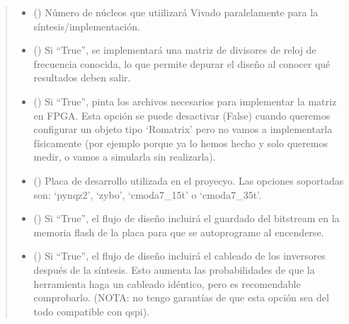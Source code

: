 \documentclass[letterpaper,10pt,english]{sphinxmanual}
\begin{document}
\begin{fulllineitems}
\begin{fulllineitems}
\begin{quote}
\begin{description}
\begin{itemize}
\item {} 
\sphinxAtStartPar
{} (\sphinxstyleliteralemphasis{\sphinxupquote{, }}) \textendash{} Número de núcleos que utiilizará Vivado paralelamente para la síntesis/implementación.

\item {} 
\sphinxAtStartPar
{} (\sphinxstyleliteralemphasis{\sphinxupquote{, }}) \textendash{} Si “True”, se implementará una matriz de divisores de reloj de frecuencia conocida, lo que permite depurar el diseño al conocer qué resultados deben salir.

\item {} 
\sphinxAtStartPar
{} (\sphinxstyleliteralemphasis{\sphinxupquote{, }}) \textendash{} Si “True”, pinta los archivos necesarios para implementar la matriz en FPGA. Esta opción se puede desactivar (False) cuando queremos configurar un objeto tipo ‘Romatrix’ pero no vamos a implementarla físicamente (por ejemplo porque ya lo hemos hecho y solo queremos medir, o vamos a simularla sin realizarla).

\item {} 
\sphinxAtStartPar
{} (\sphinxstyleliteralemphasis{\sphinxupquote{, }}) \textendash{} Placa de desarrollo utilizada en el proyecyo. Las opciones soportadas son: ‘pynqz2’, ‘zybo’, ‘cmoda7\_15t’ o ‘cmoda7\_35t’.

\item {} 
\sphinxAtStartPar
{} (\sphinxstyleliteralemphasis{\sphinxupquote{, }}) \textendash{} Si “True”, el flujo de diseño incluirá el guardado del bitstream en la memoria flash de la placa para que se auto\sphinxhyphen{}programe al encenderse.

\item {} 
\sphinxAtStartPar
{} (\sphinxstyleliteralemphasis{\sphinxupquote{, }}) \textendash{} Si “True”, el flujo de diseño incluirá el cableado de los inversores después de la síntesis. Esto aumenta las probabilidades de que la herramienta haga un cableado idéntico, pero es recomendable comprobarlo. (NOTA: no tengo garantías de que esta opción sea del todo compatible con \sphinxhyphen{}qspi).


\end{itemize}
\end{description}
\end{quote}
\end{fulllineitems}
\end{fulllineitems}
\end{document}
